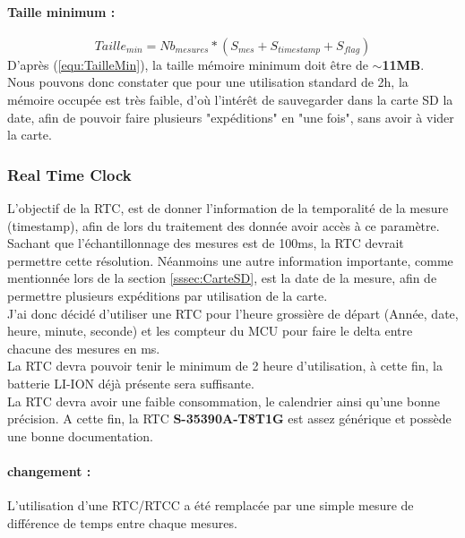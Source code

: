{{   \paragraph{Taille minimum :}
    \begin{equation} \label{equ:TailleMin}
        Taille_{min} = Nb_{mesures} * (S_{mes}+S_{timestamp}+S_{flag}) 
    \end{equation}
    D'après (\ref{equ:TailleMin}), la taille mémoire minimum doit être de \textbf{$\sim$11MB}. \vspace{+8pt} \\ 
    Nous pouvons donc constater que pour une utilisation standard de 2h, la mémoire occupée est très faible, d'où l'intérêt de sauvegarder dans la carte SD la date, afin de pouvoir faire plusieurs "expéditions" en "une fois", sans avoir à vider la carte.
}

\newpage
\subsubsection{Real Time Clock}
{
    L'objectif de la RTC, est de donner l'information de la temporalité de la mesure (timestamp), afin de lors du traitement des donnée avoir accès à ce paramètre. \\
    Sachant que l'échantillonnage des mesures est de 100ms, la RTC devrait permettre cette résolution. Néanmoins une autre information importante, comme mentionnée lors de la section \ref{sssec:CarteSD}, est la date de la mesure, afin de permettre plusieurs expéditions par utilisation de la carte. \vspace{+8pt} \\
    J'ai donc décidé d'utiliser une RTC pour l'heure grossière de départ (Année, date, heure, minute, seconde) et les compteur du MCU pour faire le delta entre chacune des mesures en ms. \\

    La RTC devra pouvoir tenir le minimum de 2 heure d'utilisation, à cette fin, la batterie LI-ION déjà présente sera suffisante. \\ 
    La RTC devra avoir une faible consommation, le calendrier ainsi qu'une bonne précision. A cette fin, la RTC \textbf{S-35390A-T8T1G} est assez générique et possède une bonne documentation.
    
    \paragraph{changement :} L'utilisation d'une RTC/RTCC a été remplacée par une simple mesure de différence de temps entre chaque mesures.
     
}}
